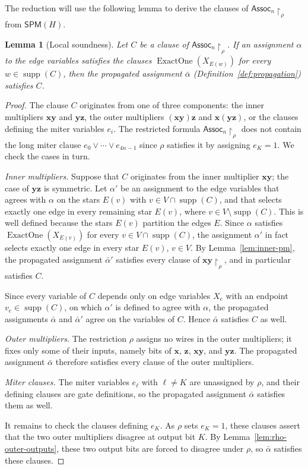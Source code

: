 \documentclass[11pt]{article}
\newtheorem{lemma}[theorem]{Lemma}
\theoremstyle{definition}
\theoremstyle{remark}
\newcommand{\Assoc}{\mathsf{Assoc}}
\newcommand{\SPM}{\mathsf{SPM}}
\newcommand{\supp}{\operatorname{supp}}
\newcommand{\vv}[1]{\mathbf{#1}}
\begin{document}
The reduction will use the following lemma to derive the clauses of $\Assoc_n\!\upharpoonright_\rho$ from $\SPM(H)$.

\begin{lemma}[Local soundness]
\label{lem:local-soundness}
Let $C$ be a clause of $\Assoc_n\!\upharpoonright_\rho$. If an assignment $\alpha$ to the edge variables satisfies the clauses $\operatorname{ExactOne}(X_{E(w)})$ for every $w\in\supp(C)$, then the propagated assignment $\bar\alpha$ (Definition~\ref{def:propagation}) satisfies $C$.
\end{lemma}

\begin{proof}
The clause $C$ originates from one of three components: the inner multipliers $\vv{x}\vv{y}$ and $\vv{y}\vv{z}$, the outer multipliers $(\vv{x}\vv{y})\vv{z}$ and $\vv{x}(\vv{y}\vv{z})$,
or the clauses defining the miter variables $e_i$. The restricted formula $\Assoc_n\!\upharpoonright_\rho$ does not contain the long miter clause $e_0\vee\cdots\vee e_{4n-1}$ since $\rho$ satisfies it by assigning $e_K=1$. We check the cases in turn.

\emph{Inner multipliers.}
Suppose that $C$ originates from the inner multiplier $\vv{x}\vv{y}$; the case of $\vv{y}\vv{z}$ is symmetric.
Let $\alpha'$ be an assignment to the edge variables that agrees with $\alpha$ on the stars $E(v)$ with $v\in V\cap\supp(C)$, and that selects exactly one edge in every remaining star $E(v)$, where $v\in V\setminus\supp(C)$. This is well defined because the stars $E(v)$ partition the edges $E$. Since $\alpha$ satisfies $\operatorname{ExactOne}(X_{E(v)})$ for every $v\in V\cap\supp(C)$, the assignment $\alpha'$ in fact selects exactly one edge in every star $E(v)$, $v\in V$. By Lemma~\ref{lem:inner-pm}, the propagated assignment $\bar\alpha'$ satisfies every clause of $\vv{x}\vv{y}\!\upharpoonright_{\rho}$, and in particular satisfies $C$.

Since every variable of $C$ depends only on edge variables $X_e$ with an endpoint $v_e\in\supp(C)$, on which $\alpha'$ is defined to agree with $\alpha$, the propagated assignments $\bar\alpha$ and $\bar\alpha'$ agree on the variables of $C$. Hence $\bar\alpha$ satisfies $C$ as well.

\emph{Outer multipliers.} The restriction $\rho$ assigns no wires in the outer multipliers; it fixes only some of their inputs, namely bits of $\vv{x}$, $\vv{z}$, $\vv{x}\vv{y}$, and $\vv{y}\vv{z}$. The propagated assignment $\bar\alpha$ therefore satisfies every clause of the outer multipliers.

\emph{Miter clauses.} The miter variables $e_\ell$ with $\ell\ne K$ are unassigned by $\rho$, and their defining clauses are gate definitions, so the
propagated assignment $\bar\alpha$ satisfies them as well.

It remains to check the clauses defining $e_K$. As $\rho$ sets $e_K=1$, these clauses assert that the two outer multipliers disagree at output bit $K$. By Lemma~\ref{lem:rho-outer-outputs}, these two output bits are forced to disagree under $\rho$, so $\bar\alpha$ satisfies these clauses.
\end{proof}
\end{document}
